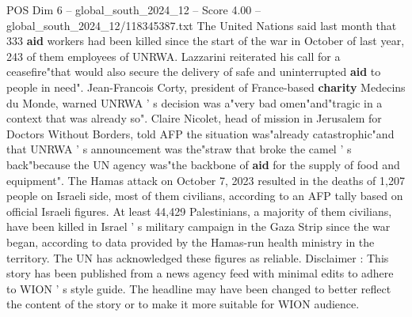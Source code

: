 \begin{textsample}{POS Dim 6 – global\_south\_2024\_12 – Score 4.00 – global\_south\_2024\_12/118345387.txt}
The United Nations said last month that 333 \textbf{aid} workers had been killed since the start of the war in October of last year, 243 of them employees of UNRWA.
Lazzarini reiterated his call for a ceasefire"that would also secure the delivery of safe and uninterrupted \textbf{aid} to people in need".
Jean-Francois Corty, president of France-based \textbf{charity} Medecins du Monde, warned UNRWA ' s decision was a"very bad omen"and"tragic in a context that was already so".
Claire Nicolet, head of mission in Jerusalem for Doctors Without Borders, told AFP the situation was"already catastrophic"and that UNRWA ' s announcement was the"straw that broke the camel ' s back"because the UN agency was"the backbone of \textbf{aid} for the supply of food and equipment".
The Hamas attack on October 7, 2023 resulted in the deaths of 1,207 people on Israeli side, most of them civilians, according to an AFP tally based on official Israeli figures.
At least 44,429 Palestinians, a majority of them civilians, have been killed in Israel ' s military campaign in the Gaza Strip since the war began, according to data provided by the Hamas-run health ministry in the territory.
The UN has acknowledged these figures as reliable.
Disclaimer : This story has been published from a news agency feed with minimal edits to adhere to WION ' s style guide.
The headline may have been changed to better reflect the content of the story or to make it more suitable for WION audience.

\end{textsample}
